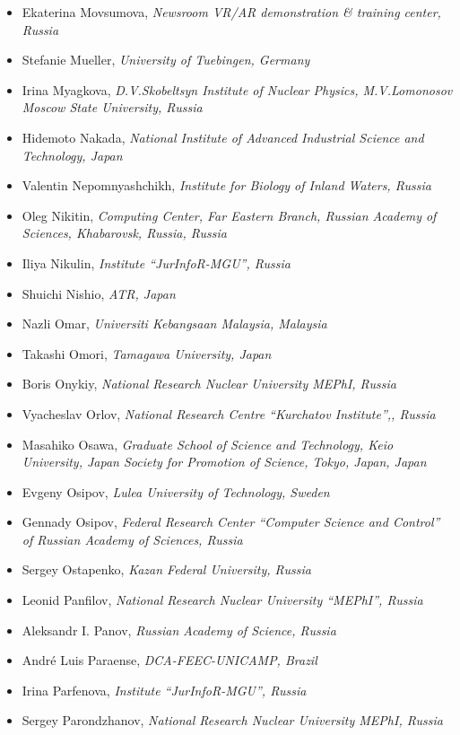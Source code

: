 \documentclass[10pt,fleqn,openany]{book} %
\begin{document}
\begin{itemize}
		\item Ekaterina Movsumova, \textit{Newsroom VR/AR demonstration \& training center, Russia}
		\item Stefanie Mueller, \textit{University of Tuebingen, Germany}
		\item Irina Myagkova, \textit{D.V.Skobeltsyn Institute of Nuclear Physics, M.V.Lomonosov Moscow State University, Russia}
		\item Hidemoto Nakada, \textit{National Institute of Advanced Industrial Science and Technology, Japan}
		\item Valentin Nepomnyashchikh, \textit{Institute for Biology of Inland Waters, Russia}
		\item Oleg Nikitin, \textit{Computing Center, Far Eastern Branch, Russian Academy of Sciences, Khabarovsk, Russia, Russia}
		\item Iliya Nikulin, \textit{Institute ``JurInfoR-MGU'', Russia}
		\item Shuichi Nishio, \textit{ATR, Japan}
		\item Nazli Omar, \textit{Universiti Kebangsaan Malaysia, Malaysia}
		\item Takashi Omori, \textit{Tamagawa University, Japan}
		\item Boris Onykiy, \textit{National Research Nuclear University MEPhI, Russia}
		\item Vyacheslav Orlov, \textit{National Research Centre ``Kurchatov Institute'',, Russia}
		\item Masahiko Osawa, \textit{Graduate School of Science and Technology, Keio University, Japan Society for Promotion of Science, Tokyo, Japan, Japan}
		\item Evgeny Osipov, \textit{Lulea University of Technology, Sweden}
		\item Gennady Osipov, \textit{Federal Research Center ``Computer Science and Control'' of Russian Academy of Sciences, Russia}
		\item Sergey Ostapenko, \textit{Kazan Federal University, Russia}
		\item Leonid Panfilov, \textit{National Research Nuclear University ``MEPhI'', Russia}
		\item Aleksandr I. Panov, \textit{Russian Academy of Science, Russia}
		\item André Luis Paraense, \textit{DCA-FEEC-UNICAMP, Brazil}
		\item Irina Parfenova, \textit{Institute ``JurInfoR-MGU'', Russia}
		\item Sergey Parondzhanov, \textit{National Research Nuclear University MEPhI, Russia}

\end{itemize}
\end{document}
